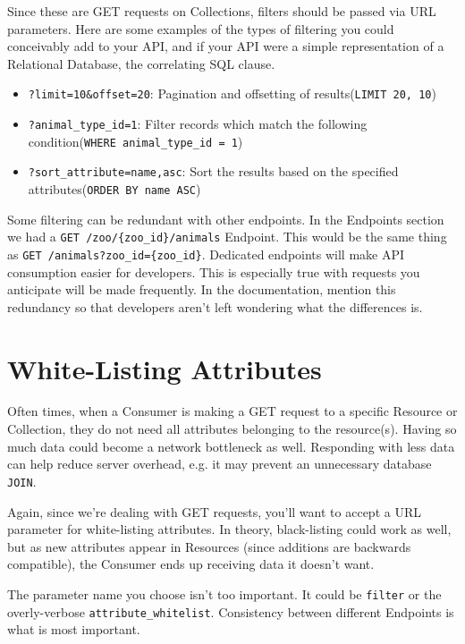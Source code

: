 Since these are GET requests on Collections, filters should be passed via URL parameters. Here are some examples of the types of filtering you could conceivably add to your API, and if your API were a simple representation of a Relational Database, the correlating SQL clause.

\begin{itemize}
\item \texttt{?limit=10\&offset=20}: Pagination and offsetting of results\newline{}(\texttt{LIMIT 20, 10})
\item \texttt{?animal\_type\_id=1}: Filter records which match the following condition\newline{}(\texttt{WHERE animal\_type\_id = 1})
\item \texttt{?sort\_attribute=name,asc}: Sort the results based on the specified attributes\newline{}(\texttt{ORDER BY name ASC})
\end{itemize}

Some filtering can be redundant with other endpoints. In the Endpoints section we had a \texttt{GET /zoo/\{zoo\_id\}/animals} Endpoint. This would be the same thing as \texttt{GET /animals?zoo\_id=\{zoo\_id\}}. Dedicated endpoints will make API consumption easier for developers. This is especially true with requests you anticipate will be made frequently. In the documentation, mention this redundancy so that developers aren't left wondering what the differences is.


\section{White-Listing Attributes}

Often times, when a Consumer is making a GET request to a specific Resource or Collection, they do not need all attributes belonging to the resource(s). Having so much data could become a network bottleneck as well. Responding with less data can help reduce server overhead, e.g. it may prevent an unnecessary database \texttt{JOIN}.

Again, since we're dealing with GET requests, you'll want to accept a URL parameter for white-listing attributes. In theory, black-listing could work as well, but as new attributes appear in Resources (since additions are backwards compatible), the Consumer ends up receiving data it doesn't want.

The parameter name you choose isn't too important. It could be \texttt{filter} or the overly-verbose \texttt{attribute\_whitelist}. Consistency between different Endpoints is what is most important.

